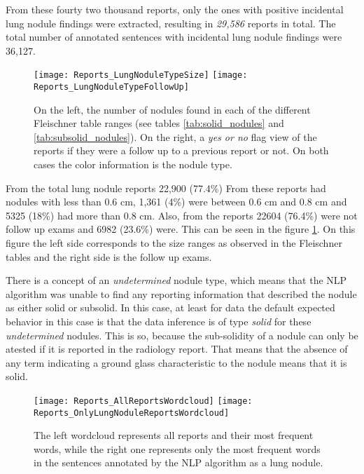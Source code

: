 From these fourty two thousand reports, only the ones with positive incidental lung nodule findings were extracted, resulting in \emph{29,586} reports in total. The total number of annotated sentences with incidental lung nodule findings were 36,127. 

\begin{center}
\begin{figure}
\begin{centering}
\texttt{[image: Reports\_LungNoduleTypeSize]}
\texttt{[image: Reports\_LungNoduleTypeFollowUp]}
\end{centering}
\caption{\label{fig:reports_nodules}On the left, the number of nodules found in each of the different Fleischner table ranges (see tables \ref{tab:solid_nodules} and \ref{tab:subsolid_nodules}). On the right, a \emph{yes or no} flag view of the reports if they were a follow up to a previous report or not. On both cases the color information is the nodule type.}
\end{figure}
\vspace*{-44pt}
\end{center}

From the total lung nodule reports 22,900 (77.4\%) From these reports had nodules with less than 0.6 cm, 1,361 (4\%) were between 0.6 cm and 0.8 cm and 5325 (18\%) had more than 0.8 cm. Also, from the reports 22604 (76.4\%) were not follow up exams and 6982 (23.6\%) were. This can be seen in the figure \ref{fig:reports_nodules}. On this figure the left side corresponds to the size ranges as observed in the Fleischner tables and the right side is the follow up exams. 

There is a concept of an \emph{undetermined} nodule type, which means that the NLP algorithm was unable to find any reporting information that described the nodule as either solid or subsolid. In this case, at least for \nomeHslShort{} data the default expected behavior in this case is that the data inference is of type \emph{solid} for these \emph{undetermined} nodules. This is so, because the sub-solidity of a nodule can only be atested if it is reported in the radiology report. That means that the absence of any term indicating a ground glass characteristic to the nodule means that it is solid.

\begin{center}
\begin{figure}
\begin{centering}
\texttt{[image: Reports\_AllReportsWordcloud]}
\texttt{[image: Reports\_OnlyLungNoduleReportsWordcloud]}
\end{centering}
\caption{\label{fig:wordclouds}The left wordcloud represents all reports and their most frequent words, while the right one represents only the most frequent words in the sentences annotated by the NLP algorithm as a lung nodule.}
\end{figure}
\vspace*{-44pt}
\end{center}

